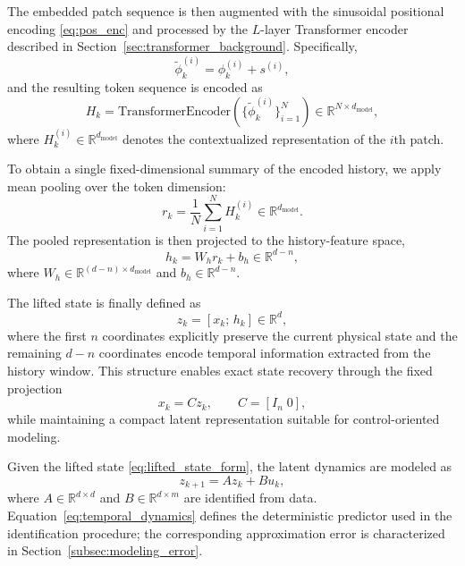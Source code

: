 \documentclass[journal]{IEEEtran}
\begin{document}
The embedded patch sequence is then augmented with the sinusoidal positional encoding \eqref{eq:pos_enc} and processed by the $L$-layer Transformer encoder described in Section~\ref{sec:transformer_background}. Specifically,
\begin{equation}
    \tilde{\phi}_k^{(i)} = \phi_k^{(i)} + s^{(i)},
    \label{eq:pos_enc_applied}
\end{equation}
and the resulting token sequence is encoded as
\begin{equation}
    H_k = \mathrm{TransformerEncoder}\!\left(
        \{\tilde{\phi}_k^{(i)}\}_{i=1}^{N}
    \right) \in \mathbb{R}^{N \times d_{\mathrm{model}}},
    \label{eq:transformer_enc}
\end{equation}
where $H_k^{(i)} \in \mathbb{R}^{d_{\mathrm{model}}}$ denotes the contextualized representation of the $i$th patch.

To obtain a single fixed-dimensional summary of the encoded history, we apply mean pooling over the token dimension:
\begin{equation}
    r_k = \frac{1}{N}\sum_{i=1}^{N} H_k^{(i)} \in \mathbb{R}^{d_{\mathrm{model}}}.
    \label{eq:pooling}
\end{equation}
The pooled representation is then projected to the history-feature space,
\begin{equation}
    h_k = W_h r_k + b_h \in \mathbb{R}^{d-n},
    \label{eq:history_feature}
\end{equation}
where $W_h \in \mathbb{R}^{(d-n)\times d_{\mathrm{model}}}$ and $b_h \in \mathbb{R}^{d-n}$.

The lifted state is finally defined as
\begin{equation}
    z_k = [x_k;\,h_k] \in \mathbb{R}^{d},
    \label{eq:lifted_state_form}
\end{equation}
where the first $n$ coordinates explicitly preserve the current physical state and the remaining $d-n$ coordinates encode temporal information extracted from the history window. This structure enables exact state recovery through the fixed projection
\begin{equation}
    x_k = C z_k, \qquad C = [I_n\;0],
    \label{eq:decoder_projection}
\end{equation}
while maintaining a compact latent representation suitable for control-oriented modeling.

Given the lifted state \eqref{eq:lifted_state_form}, the latent dynamics are modeled as
\begin{equation}
    z_{k+1} = A z_k + B u_k,
    \label{eq:temporal_dynamics}
\end{equation}
where $A \in \mathbb{R}^{d\times d}$ and $B \in \mathbb{R}^{d\times m}$ are identified from data. Equation~\eqref{eq:temporal_dynamics} defines the deterministic predictor used in the identification procedure; the corresponding approximation error is characterized in Section~\ref{subsec:modeling_error}.
\end{document}
